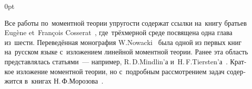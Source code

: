 \begin{changemargin}{\parindent}{0pt}
\fontsize{10}{12}\selectfont

\begin{otherlanguage}{russian}

Все работы по~моментной теории упругости содержат ссылки на~книгу братьев Eugène et~François Cosserat~\cite{cosserat}, где~трёх\-мерной среде посвящена одна глава из~шести. Переведённая монография \hbox{W\hspace{-0.2ex}.\:Nowacki}~\cite{nowacki-elasticity} была одной из первых книг на~русском языке с~изложением линейной моментной теории. Ранее эта область представлялась статьями~--- например, R.\,D.\:Mindlin’а и~H.\,F.\:Tiersten’а~\cite{mindlin.tiersten}. Краткое изложение моментной теории, но с~подробным рассмотрением задач содержится в~книгах Н.\,Ф.\:Морозова~\cite{morozov-twodimensionalproblems, morozov-fractures}.

\end{otherlanguage}

\end{changemargin}
